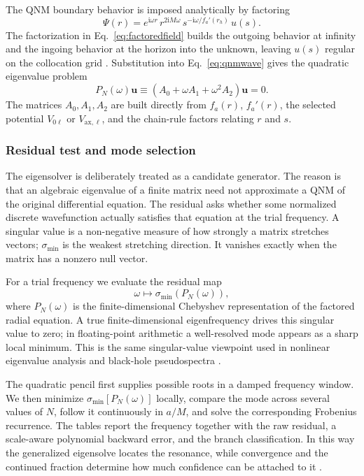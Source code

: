 \documentclass[12pt,a4paper]{article}
\newcommand{\ii}{\mathrm{i}}
\begin{document}
The QNM boundary behavior is imposed analytically by factoring
\begin{equation}
\Psi(r)=
e^{\ii\omega r}\,
r^{2\ii M\omega}\,
s^{-\ii\omega/f_a'(r_h)}\,u(s).
\label{eq:factoredfield}
\end{equation}
The factorization in Eq.~\eqref{eq:factoredfield} builds the outgoing behavior
at infinity and the ingoing behavior at the horizon into the unknown, leaving
\(u(s)\) regular on the collocation grid \cite{Leaver1985,Jansen2017}.
Substitution into Eq.~\eqref{eq:qnmwave} gives the quadratic eigenvalue problem
\begin{equation}
P_N(\omega)\bm{u}
\equiv
\left(A_0+\omega A_1+\omega^2A_2\right)\bm{u}=0.
\label{eq:polynomialproblem}
\end{equation}
The matrices \(A_0,A_1,A_2\) are built directly from \(f_a(r)\), \(f_a'(r)\), the selected potential \(V_{0\ell}\) or \(V_{\mathrm{ax},\ell}\), and the chain-rule factors relating \(r\) and \(s\).

\subsubsection{Residual test and mode selection}

The eigensolver is deliberately treated as a candidate generator.  The reason
is that an algebraic eigenvalue of a finite matrix need not approximate a QNM
of the original differential equation.  The residual asks whether some
normalized discrete wavefunction actually satisfies that equation at the
trial frequency.  A singular value is a non-negative measure of how strongly
a matrix stretches vectors; \(\sigma_{\min}\) is the weakest stretching
direction.  It vanishes exactly when the matrix has a nonzero null vector.

For a trial frequency we evaluate the residual map
\begin{equation*}
\omega \mapsto \sigma_{\min}\!\left(P_N(\omega)\right),
\end{equation*}
where \(P_N(\omega)\) is the finite-dimensional Chebyshev representation of
the factored radial equation. A true finite-dimensional eigenfrequency drives
this singular value to zero; in floating-point arithmetic a well-resolved mode
appears as a sharp local minimum. This is the same singular-value viewpoint
used in nonlinear eigenvalue analysis and black-hole pseudospectra
\cite{Sadkane2023,Jaramillo2021,Cao2024}.

The quadratic pencil first supplies possible roots in a damped frequency
window. We then minimize \(\sigma_{\min}[P_N(\omega)]\) locally, compare the
mode across several values of \(N\), follow it continuously in \(a/M\), and
solve the corresponding Frobenius recurrence. The tables report the frequency
together with the raw residual, a scale-aware polynomial backward error, and
the branch classification. In this way the generalized eigensolve locates the
resonance, while convergence and the continued fraction determine how much
confidence can be attached to it \cite{Leaver1985,Jansen2017}.
\end{document}
